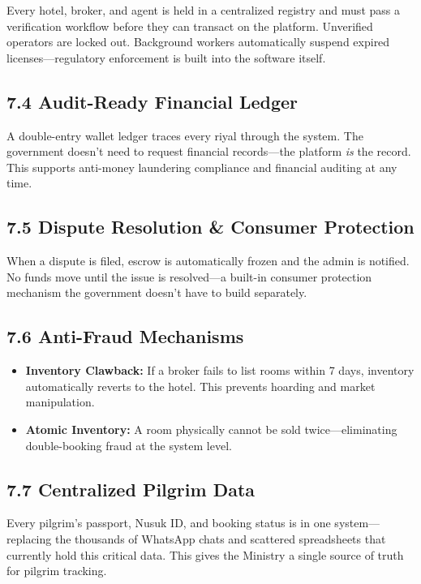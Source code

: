 \documentclass[11pt,a4paper]{article}
\begin{document}
Every hotel, broker, and agent is held in a centralized registry and must pass a verification workflow before they can transact on the platform. Unverified operators are locked out. Background workers automatically suspend expired licenses---regulatory enforcement is built into the software itself.


\subsection*{7.4 Audit-Ready Financial Ledger}


A double-entry wallet ledger traces every riyal through the system. The government doesn't need to request financial records---the platform \textit{is} the record. This supports anti-money laundering compliance and financial auditing at any time.


\subsection*{7.5 Dispute Resolution \& Consumer Protection}


When a dispute is filed, escrow is automatically frozen and the admin is notified. No funds move until the issue is resolved---a built-in consumer protection mechanism the government doesn't have to build separately.


\subsection*{7.6 Anti-Fraud Mechanisms}

\begin{itemize}
  \item \textbf{Inventory Clawback:} If a broker fails to list rooms within 7 days, inventory automatically reverts to the hotel. This prevents hoarding and market manipulation.
  \item \textbf{Atomic Inventory:} A room physically cannot be sold twice---eliminating double-booking fraud at the system level.
\end{itemize}

\subsection*{7.7 Centralized Pilgrim Data}


Every pilgrim's passport, Nusuk ID, and booking status is in one system---replacing the thousands of WhatsApp chats and scattered spreadsheets that currently hold this critical data. This gives the Ministry a single source of truth for pilgrim tracking.
\end{document}
